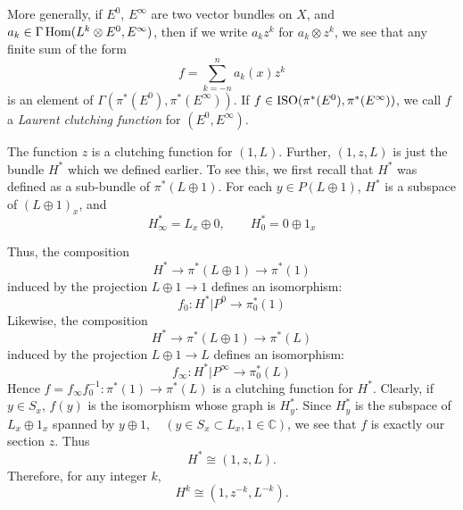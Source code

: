 More generally, if $E^0$, $E^\infty$ are two vector bundles on $X$, and $a_k \in \Gamma\operatorname{Hom}(L^k \otimes E^0, E^\infty)$, then if we write $a_k z^k$ for $a_k \otimes z^k$, we see that any finite sum of the form
\begin{equation*}
    f = \sum_{k = -n}^n a_k(x) z^k
\end{equation*}
is an element of $\Gamma(\pi^*(E^0), \pi^*(E^\infty))$. If $f \in \operatorname{ISO}(\pi^*(E^0), \pi^*(E^\infty))$, we call $f$ a \textit{Laurent clutching function} for $(E^0, E^\infty)$. \par 

The function $z$ is a clutching function for $(1, L)$. Further, $(1, z, L)$ is just the bundle $H^*$ which we defined earlier. To see this, we first recall that $H^*$ was defined as a sub-bundle of $\pi^*(L \oplus 1)$. For each $y \in P(L \oplus 1)$, $H^*$ is a subspace of $(L \oplus 1)_x$, and
\begin{equation*}
    H^*_\infty = L_x \oplus 0, \qquad H^*_0 = 0 \oplus 1_x
\end{equation*}

Thus, the composition
\begin{equation*}
    H^* \to \pi^*(L \oplus 1) \to \pi^*(1)
\end{equation*}
induced by the projection $L \oplus 1 \to 1$ defines an isomorphism:
\begin{equation*}
    f_0: H^* \vert P^0 \to \pi^*_0(1)
\end{equation*}
Likewise, the composition
\begin{equation*}
    H^* \to \pi^*(L \oplus 1) \to \pi^*(L)
\end{equation*}
induced by the projection $L \oplus 1 \to L$ defines an isomorphism:
\begin{equation*}
    f_\infty: H^* \vert P^\infty \to \pi^*_0(L)
\end{equation*}
Hence $f = f_\infty f_0^{-1}: \pi^*(1) \to \pi^*(L)$ is a clutching function for $H^*$. Clearly, if $y \in S_x$, $f(y)$ is the isomorphism whose graph is $H^*_y$. Since $H^*_y$ is the subspace of $L_x \oplus 1_x$ spanned by $y \oplus 1, \quad (y \in S_x \subset L_x, 1 \in \mathbb{C})$, we see that $f$ is exactly our section $z$. Thus
\begin{equation*}
    H^* \cong (1, z, L).
\end{equation*}
Therefore, for any integer $k$,
\begin{equation*}
    H^k \cong (1, z^{-k}, L^{-k}).
\end{equation*} \par 

